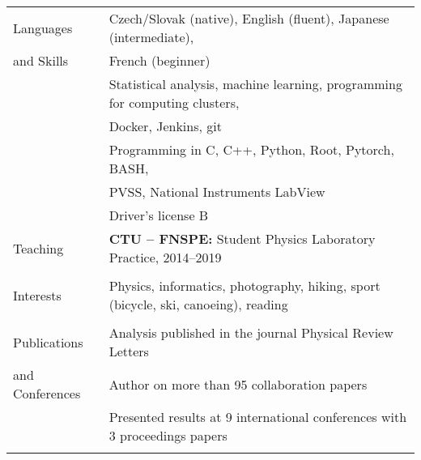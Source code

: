 \documentclass[a4paper,11pt,oneside]{article}
\begin{document}
\newpage

\noindent  \begin{tabular}{@{} l l}
  \Large{Languages}   & Czech/Slovak (native), English (fluent), Japanese (intermediate), \\
\Large{and Skills}    & French (beginner)  \\[.2cm]
     & Statistical analysis, machine learning, programming for computing clusters, \\
     & Docker, Jenkins, git\\[.2cm]
     & Programming in C, C++, Python, Root, Pytorch, BASH,  \\
     & PVSS, National Instruments LabView \\[.2cm]
     & Driver's license B\\[.4cm]
\Large{Teaching} & \textbf{CTU -- FNSPE\@:} Student Physics Laboratory Practice, 2014--2019\\
     \\[.1cm]
\Large{Interests}    
     & Physics, informatics, photography, hiking, sport (bicycle, ski, canoeing), reading \\
     \\[.1cm]
\Large{Publications}   & Analysis published in the journal Physical Review Letters \\
\Large{and Conferences} & Author on more than 95 collaboration papers \\[.2cm]
     & Presented results at 9 international conferences with 3 proceedings papers\\
     & \\[.5cm]
\end{tabular}
\end{document}
